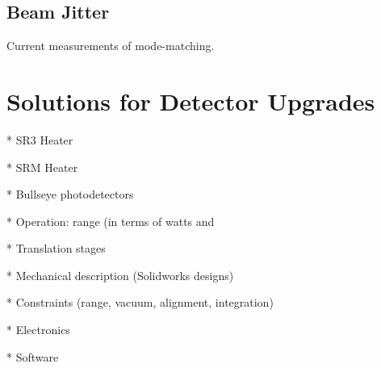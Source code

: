 \documentclass[oneside]{book}
\begin{document}
	
	\section{Beam Jitter}
	
	Current measurements of mode-matching.


\chapter{Solutions for Detector Upgrades}

* SR3 Heater

* SRM Heater

* Bullseye photodetectors

* Operation: range (in terms of watts and %

* Translation stages

* Mechanical description (Solidworks designs)

* Constraints (range, vacuum, alignment, integration)

* Electronics 

* Software


	\listoffigures
	\listoftables
\end{document}
